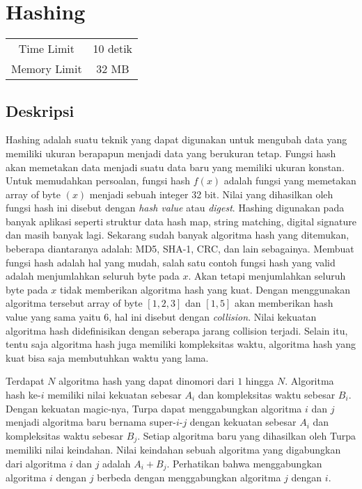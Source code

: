 \documentclass{article}
\begin{document}
\section*{\hfil Hashing\hfil}

\begin{center}
\begin{tabular}{ |cc| } 
 \hline
 Time Limit & 10 detik \\ 
 Memory Limit & 32 MB \\
 \hline
\end{tabular}
\end{center}

\subsection*{Deskripsi}

\par Hashing adalah suatu teknik yang dapat digunakan untuk mengubah data yang memiliki ukuran berapapun menjadi data yang berukuran tetap. Fungsi hash akan memetakan data menjadi suatu data baru yang memiliki ukuran konstan. Untuk memudahkan persoalan, fungsi hash $f(x)$ adalah fungsi yang memetakan array of byte $(x)$ menjadi sebuah integer 32 bit. Nilai yang dihasilkan oleh fungsi hash ini disebut dengan \textit{hash value} atau \textit{digest}. Hashing digunakan pada banyak aplikasi seperti struktur data hash map, string matching, digital signature dan masih banyak lagi. Sekarang sudah banyak algoritma hash yang ditemukan, beberapa diantaranya adalah: MD5, SHA-1, CRC, dan lain sebagainya. Membuat fungsi hash adalah hal yang mudah, salah satu contoh fungsi hash yang valid adalah menjumlahkan seluruh byte pada $x$. Akan tetapi menjumlahkan seluruh byte pada $x$ tidak memberikan algoritma hash yang kuat. Dengan menggunakan algoritma tersebut array of byte $[1,2,3]$ dan $[1,5]$ akan memberikan hash value yang sama yaitu $6$, hal ini disebut dengan \textit{collision}. Nilai kekuatan algoritma hash didefinisikan dengan seberapa jarang collision terjadi. Selain itu, tentu saja algoritma hash juga memiliki kompleksitas waktu, algoritma hash yang kuat bisa saja membutuhkan waktu yang lama.

\par Terdapat $N$ algoritma hash yang dapat dinomori dari $1$ hingga $N$. Algoritma hash ke-$i$ memiliki nilai kekuatan sebesar $A_i$ dan kompleksitas waktu sebesar $B_i$. Dengan kekuatan magic-nya, Turpa dapat menggabungkan algoritma $i$ dan $j$ menjadi algoritma baru bernama super-$i$-$j$ dengan kekuatan sebesar $A_i$ dan kompleksitas waktu sebesar $B_j$. Setiap algoritma baru yang dihasilkan oleh Turpa memiliki nilai keindahan. Nilai keindahan sebuah algoritma yang digabungkan dari algoritma $i$ dan $j$ adalah $A_i + B_j$. Perhatikan bahwa menggabungkan algoritma $i$ dengan $j$ berbeda dengan menggabungkan algoritma $j$ dengan $i$.
\end{document}
